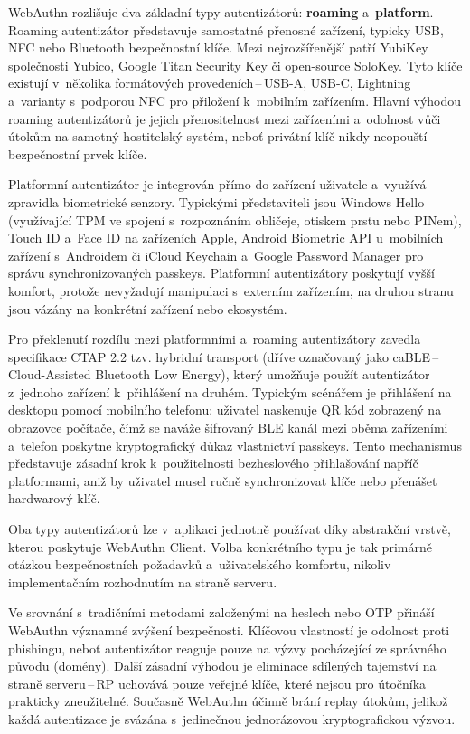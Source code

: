 WebAuthn rozlišuje dva základní typy autentizátorů: \textbf{roaming} a~\textbf{platform}.
Roaming autentizátor představuje samostatné přenosné zařízení, typicky USB, NFC nebo Bluetooth bezpečnostní klíče.
Mezi nejrozšířenější patří YubiKey společnosti Yubico, Google Titan Security Key či open-source SoloKey.
Tyto klíče existují v~několika formátových provedeních\,--\,USB-A, USB-C, Lightning a~varianty s~podporou NFC pro přiložení k~mobilním zařízením.
Hlavní výhodou roaming autentizátorů je jejich přenositelnost mezi zařízeními a~odolnost vůči útokům na samotný hostitelský systém, neboť privátní klíč nikdy neopouští bezpečnostní prvek klíče.

Platformní autentizátor je integrován přímo do zařízení uživatele a~využívá zpravidla biometrické senzory.
Typickými představiteli jsou Windows Hello (využívající TPM ve spojení s~rozpoznáním obličeje, otiskem prstu nebo PINem), Touch ID a~Face ID na zařízeních Apple, Android Biometric API u~mobilních zařízení s~Androidem či iCloud Keychain a~Google Password Manager pro správu synchronizovaných passkeys.
Platformní autentizátory poskytují vyšší komfort, protože nevyžadují manipulaci s~externím zařízením, na druhou stranu jsou vázány na konkrétní zařízení nebo ekosystém.

Pro překlenutí rozdílu mezi platformními a~roaming autentizátory zavedla specifikace CTAP 2.2 tzv. hybridní transport (dříve označovaný jako caBLE\,--\,Cloud-Assisted Bluetooth Low Energy), který umožňuje použít autentizátor z~jednoho zařízení k~přihlášení na druhém.
Typickým scénářem je přihlášení na desktopu pomocí mobilního telefonu: uživatel naskenuje QR kód zobrazený na obrazovce počítače, čímž se naváže šifrovaný BLE kanál mezi oběma zařízeními a~telefon poskytne kryptografický důkaz vlastnictví passkeys.
Tento mechanismus představuje zásadní krok k~použitelnosti bezheslového přihlašování napříč platformami, aniž by uživatel musel ručně synchronizovat klíče nebo přenášet hardwarový klíč.

Oba typy autentizátorů lze v~aplikaci jednotně používat díky abstrakční vrstvě, kterou poskytuje WebAuthn Client.
Volba konkrétního typu je tak primárně otázkou bezpečnostních požadavků a~uživatelského komfortu, nikoliv implementačním rozhodnutím na straně serveru.

Ve srovnání s~tradičními metodami založenými na heslech nebo OTP přináší WebAuthn významné zvýšení bezpečnosti.
Klíčovou vlastností je odolnost proti phishingu, neboť autentizátor reaguje pouze na výzvy pocházející ze správného původu (domény).
Další zásadní výhodou je eliminace sdílených tajemství na straně serveru\,--\,RP uchovává pouze veřejné klíče, které nejsou pro útočníka prakticky zneužitelné.
Současně WebAuthn účinně brání replay útokům, jelikož každá autentizace je svázána s~jedinečnou jednorázovou kryptografickou výzvou.


